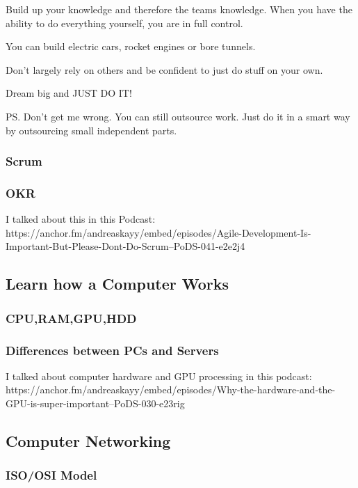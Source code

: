 \documentclass[12pt]{scrartcl} %
\begin{document}
Build up your knowledge and therefore the teams knowledge. When you have the ability to do everything yourself, you are in full control.

You can build electric cars, rocket engines or bore tunnels.

Don’t largely rely on others and be confident to just do stuff on your own.

Dream big and JUST DO IT!

PS. Don’t get me wrong. You can still outsource work. Just do it in a smart way by outsourcing small independent parts.

\subsubsection{Scrum}

\subsubsection{OKR}

I talked about this in this Podcast: https://anchor.fm/andreaskayy/embed/episodes/Agile-Development-Is-Important-But-Please-Dont-Do-Scrum--PoDS-041-e2e2j4

 \subsection{Learn how a Computer Works}

\subsubsection{CPU,RAM,GPU,HDD}

\subsubsection{Differences between PCs and Servers}

I talked about computer hardware and GPU processing in this podcast: https://anchor.fm/andreaskayy/embed/episodes/Why-the-hardware-and-the-GPU-is-super-important--PoDS-030-e23rig

\subsection{Computer Networking}

\subsubsection{ISO/OSI Model}
\end{document}
